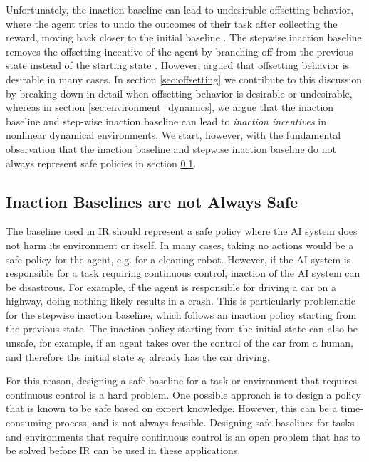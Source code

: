 \documentclass[letterpaper]{article} %
\begin{document}
Unfortunately, the inaction baseline can lead to undesirable offsetting behavior, where the agent tries to undo the outcomes of their task after collecting the reward, moving back closer to the initial baseline \citep{turner2020conservative}. The stepwise inaction baseline removes the offsetting incentive of the agent by branching off from the previous state instead of the starting state \citep{turner2020conservative}. However, \citet{krakovna2020avoiding} argued that offsetting behavior is desirable in many cases. In section \ref{sec:offsetting} we contribute to this discussion by breaking down in detail when offsetting behavior is desirable or undesirable, whereas in section \ref{sec:environment_dynamics}, we argue that the inaction baseline and step-wise inaction baseline can lead to \textit{inaction incentives} in nonlinear dynamical environments. We start, however, with the fundamental observation that the inaction baseline and stepwise inaction baseline do not always represent safe policies in section \ref{sec:inact_baseline}.

\subsection{Inaction Baselines are not Always Safe} \label{sec:inact_baseline}
The baseline used in IR should represent a safe policy where the AI system does not harm its environment or itself. In many cases, taking no actions would be a safe policy for the agent, e.g. for a cleaning robot. However, if the AI system is responsible for a task requiring continuous control, inaction of the AI system can be disastrous. For example, if the agent is responsible for driving a car on a highway, doing nothing likely results in a crash. This is particularly problematic for the stepwise inaction baseline, which follows an inaction policy starting from the previous state. The inaction policy starting from the initial state can also be unsafe, for example, if an agent takes over the control of the car from a human, and therefore the initial state $s_0$ already has the car driving.

For this reason, designing a safe baseline for a task or environment that requires continuous control is a hard problem. One possible approach is to design a policy that is known to be safe based on expert knowledge. However, this can be a time-consuming process, and is not always feasible. Designing safe baselines for tasks and environments that require continuous control is an open problem that has to be solved before IR can be used in these applications.
\end{document}
